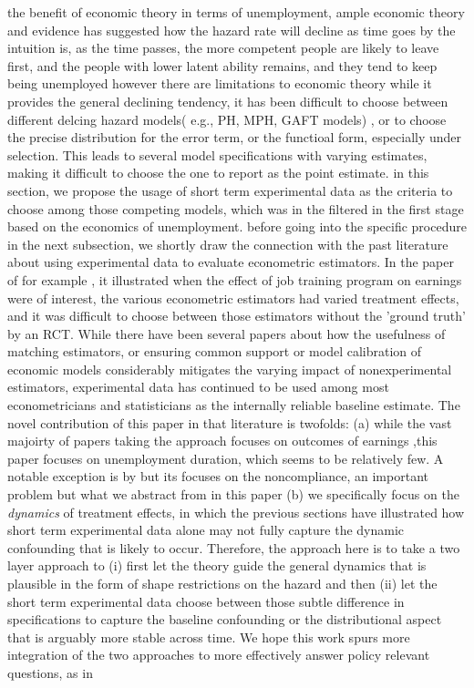\documentclass{article}
\begin{document}
 the benefit of economic theory
     in terms of unemployment, ample economic theory and evidence has suggested how the hazard rate will decline as time goes by
         the intuition is, as the time passes, the more competent people are likely to leave first, and the people with lower latent ability remains, and they tend to keep being unemployed 
         however there are limitations to economic theory
             while it provides the general declining tendency, it has been difficult to choose between different delcing hazard models( e.g., PH, MPH, GAFT models) , or to choose the precise distribution for the error term, or the functioal form, especially under selection. This leads to several model specifications with varying estimates, making it difficult to choose the one to report as the point estimate.
             in this section, we propose the usage of short term experimental data as the criteria to choose among those competing models, which was in the filtered in the first stage based on the economics of unemployment.
             before going into the specific procedure in the next subsection, we shortly draw the connection with the past literature about using experimental data to evaluate econometric estimators. In the paper of for example \cite{lalonde 1986}, it illustrated when the effect of job training program on earnings were of interest, the various econometric estimators had varied treatment effects, and it was difficult to choose between those estimators without the 'ground truth' by an RCT. While there have been several papers about how the usefulness of matching estimators, or ensuring common support \cite{ heckman ichimura todd 197} or model calibration of economic models considerably mitigates the varying impact of nonexperimental estimators, experimental data has continued to be used among most econometricians and statisticians as the internally reliable baseline estimate. 
             The novel contribution of this paper in that literature is twofolds: (a) while  the vast majoirty of papers taking the \cite{lalonde 1986} approach focuses on outcomes of earnings ,this paper focuses on unemployment duration, which seems to be relatively few. A notable exception is by \cite{ham lalonde 1999} but its focuses on the noncompliance, an important problem but what we abstract from in this paper (b) we specifically focus on the \textit{dynamics  }of treatment effects, in which the previous sections have illustrated how short term experimental data alone may not fully capture the dynamic confounding that is likely to occur. Therefore, the approach here is to take a two layer approach to (i) first let the theory guide the general dynamics that is plausible in the form of shape restrictions on the hazard and then (ii) let the short term experimental data choose between those subtle difference in specifications to capture the baseline confounding or the distributional aspect that is  arguably more stable across time.
             We hope this work spurs more integration of the two approaches to more effectively answer policy relevant questions, as in \cite{todd and wolpin 2021, }
             
\end{document}
